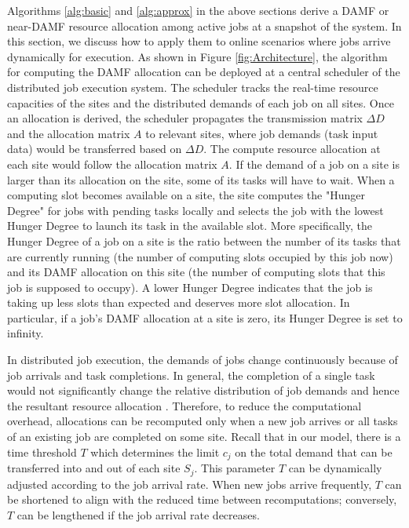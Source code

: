 Algorithms \ref{alg:basic} and \ref{alg:approx} in the above sections derive a DAMF or near-DAMF resource allocation among active jobs at a snapshot of the system. In this section, we discuss how to apply them to online scenarios where jobs arrive dynamically for execution. As shown in Figure \ref{fig:Architecture}, the algorithm for computing the DAMF allocation can be deployed at a central scheduler of the distributed job execution system. The scheduler tracks the real-time resource capacities of the sites and the distributed demands of each job on all sites. Once an allocation is derived, the scheduler propagates the transmission matrix $\Delta D$ and the allocation matrix $A$ to relevant sites, where job demands (task input data) would be transferred based on $\Delta D$. The compute resource allocation at each site would follow the allocation matrix $A$. If the demand of a job on a site is larger than its allocation on the site, some of its tasks will have to wait. When a computing slot becomes available on a site, the site computes the "Hunger Degree" for jobs with pending tasks locally and selects the job with the lowest Hunger Degree to launch its task in the available slot. More specifically, the Hunger Degree of a job on a site is the ratio between the number of its tasks that are currently running (the number of computing slots occupied by this job now) and its DAMF allocation on this site (the number of computing slots that this job is supposed to occupy). A lower Hunger Degree indicates that the job is taking up less slots than expected and deserves more slot allocation. In particular, if a job's DAMF allocation at a site is zero, its Hunger Degree is set to infinity.



In distributed job execution, the demands of jobs change continuously because of job arrivals and task completions. In general, the completion of a single task would not significantly change the relative distribution of job demands and hence the resultant resource allocation \cite{AMF}. Therefore, to reduce the computational overhead, allocations can be recomputed only when a new job arrives or all tasks of an existing job are completed on some site. Recall that in our model, there is a time threshold $T$ which determines the limit $c_j$ on the total demand that can be transferred into and out of each site $S_j$. This parameter $T$ can be dynamically adjusted according to the job arrival rate. When new jobs arrive frequently, $T$ can be shortened to align with the reduced time between recomputations; conversely, $T$ can be lengthened if the job arrival rate decreases.


